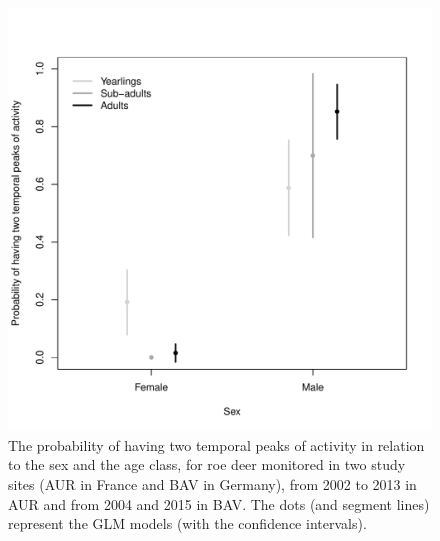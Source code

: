 \documentclass[a4paper,11pt]{article}
\begin{document}
\begin{figure} [!h]
  \centering
  \includegraphics[width=0.5\linewidth]{./figures/Fig4.pdf}
  \caption{The probability of having two temporal peaks of activity in
    relation to the sex and the age class, for roe deer monitored in
    two study sites (AUR in France and BAV in Germany), from 2002 to
    2013 in AUR and from 2004 and 2015 in BAV. The dots (and segment
    lines) represent the GLM models (with the confidence intervals).}
\end{figure}
\end{document}
